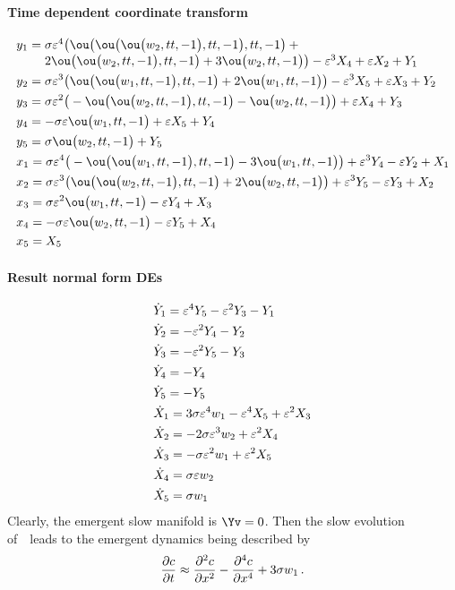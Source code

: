 \paragraph{Time dependent coordinate transform}
\begin{align*}&
y_{1}=\ParMath{ \sigma  \eps^{4} \big(\ou\big(\ou\big(\ou\big(w_{2},tt,-1\big),tt,
-1\big),tt,-1\big)+2 \ou\big(\ou\big(w_{2},tt,-1\big),tt,-1\big)+3 \ou
\big(w_{2},tt,-1\big)\big)-\eps^{3} X_{4}+\eps X_{2}+Y_{1}
}\\& 
y_{2}=\sigma  \eps^{3} \big(\ou\big(\ou\big(w_{1},tt,-1\big),tt,-1\big)+
2 \ou\big(w_{1},tt,-1\big)\big)-\eps^{3} X_{5}+\eps X_{3}+Y_{2}
\\& 
y_{3}=\sigma  \eps^{2} \big(-\ou\big(\ou\big(w_{2},tt,-1\big),tt,-1\big)
-\ou\big(w_{2},tt,-1\big)\big)+\eps X_{4}+Y_{3}
\\& 
y_{4}=-\sigma  \eps \ou\big(w_{1},tt,-1\big)+\eps X_{5}+Y_{4}
\\& 
y_{5}=\sigma  \ou\big(w_{2},tt,-1\big)+Y_{5}
\\& 
x_{1}=\sigma  \eps^{4} \big(-\ou\big(\ou\big(w_{1},tt,-1\big),tt,-1\big)
-3 \ou\big(w_{1},tt,-1\big)\big)+\eps^{3} Y_{4}-\eps Y_{2}+X_{1}
\\& 
x_{2}=\sigma  \eps^{3} \big(\ou\big(\ou\big(w_{2},tt,-1\big),tt,-1\big)+
2 \ou\big(w_{2},tt,-1\big)\big)+\eps^{3} Y_{5}-\eps Y_{3}+X_{2}
\\& 
x_{3}=\sigma  \eps^{2} \ou\big(w_{1},tt,-1\big)-\eps Y_{4}+X_{3}
\\& 
x_{4}=-\sigma  \eps \ou\big(w_{2},tt,-1\big)-\eps Y_{5}+X_{4}
\\& 
x_{5}=X_{5}
\end{align*}


\paragraph{Result normal form DEs}
\begin{align*}&
\dot Y_{1}=\varepsilon^{4} Y_{5}-\varepsilon^{2} Y_{3}-Y_{1}
\\& 
\dot Y_{2}=-\varepsilon^{2} Y_{4}-Y_{2}
\\& 
\dot Y_{3}=-\varepsilon^{2} Y_{5}-Y_{3}
\\& 
\dot Y_{4}=-Y_{4}
\\& 
\dot Y_{5}=-Y_{5}
\\& 
\dot X_{1}=3 \sigma  \varepsilon^{4} w_{1}-\varepsilon^{4} X_{5}+\varepsilon^{2} X_{3}
\\& 
\dot X_{2}=-2 \sigma  \varepsilon^{3} w_{2}+\varepsilon^{2} X_{4}
\\& 
\dot X_{3}=-\sigma  \varepsilon^{2} w_{1}+\varepsilon^{2} X_{5}
\\& 
\dot X_{4}=\sigma  \varepsilon w_{2}
\\& 
\dot X_{5}=\sigma  w_{1}
\end{align*}
Clearly, the emergent slow manifold is \(\Yv=0\).
Then the slow evolution of~\Xv\ leads to the emergent dynamics being described by 
\begin{equation*}
\D tc\approx\DD xc-\Dn x4c+3\sigma w_1\,.
\end{equation*}



